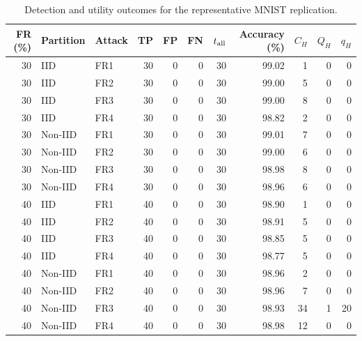 \begin{table}[t]
\centering\footnotesize\setlength{\tabcolsep}{4pt}
\caption{Detection and utility outcomes for the representative MNIST replication.}\label{tab:detail-mnist}
\begin{tabular}{rllrrrrrrrr}
\toprule
FR (\%) & Partition & Attack & TP & FP & FN & $t_{\rm all}$ & Accuracy (\%) & $C_H$ & $Q_H$ & $q_H$ \\
\midrule
30 & IID & FR1 & 30 & 0 & 0 & 30 & 99.02 & 1 & 0 & 0 \\
30 & IID & FR2 & 30 & 0 & 0 & 30 & 99.00 & 5 & 0 & 0 \\
30 & IID & FR3 & 30 & 0 & 0 & 30 & 99.00 & 8 & 0 & 0 \\
30 & IID & FR4 & 30 & 0 & 0 & 30 & 98.82 & 2 & 0 & 0 \\
30 & Non-IID & FR1 & 30 & 0 & 0 & 30 & 99.01 & 7 & 0 & 0 \\
30 & Non-IID & FR2 & 30 & 0 & 0 & 30 & 99.00 & 6 & 0 & 0 \\
30 & Non-IID & FR3 & 30 & 0 & 0 & 30 & 98.98 & 8 & 0 & 0 \\
30 & Non-IID & FR4 & 30 & 0 & 0 & 30 & 98.96 & 6 & 0 & 0 \\
40 & IID & FR1 & 40 & 0 & 0 & 30 & 98.90 & 1 & 0 & 0 \\
40 & IID & FR2 & 40 & 0 & 0 & 30 & 98.91 & 5 & 0 & 0 \\
40 & IID & FR3 & 40 & 0 & 0 & 30 & 98.85 & 5 & 0 & 0 \\
40 & IID & FR4 & 40 & 0 & 0 & 30 & 98.77 & 5 & 0 & 0 \\
40 & Non-IID & FR1 & 40 & 0 & 0 & 30 & 98.96 & 2 & 0 & 0 \\
40 & Non-IID & FR2 & 40 & 0 & 0 & 30 & 98.96 & 7 & 0 & 0 \\
40 & Non-IID & FR3 & 40 & 0 & 0 & 30 & 98.93 & 34 & 1 & 20 \\
40 & Non-IID & FR4 & 40 & 0 & 0 & 30 & 98.98 & 12 & 0 & 0 \\
\bottomrule
\end{tabular}

\end{table}

